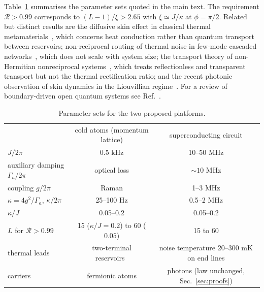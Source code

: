\documentclass[reprint,aps,prl,superscriptaddress,nofootinbib,floatfix]{revtex4-2}
\newcommand{\R}{\mathcal{R}}
\begin{document}
Table~\ref{tab:exp} summarises the parameter sets quoted in the main text. The requirement $\R>0.99$ corresponds to $(L-1)/\xi>2.65$ with $\xi\simeq J/\kappa$ at $\phi=\pi/2$. Related but distinct results are the diffusive skin effect in classical thermal metamaterials~\cite{Cao2021}, which concerns heat conduction rather than quantum transport between reservoirs; non-reciprocal routing of thermal noise in few-mode cascaded networks~\cite{Xuereb2018}, which does not scale with system size; the transport theory of non-Hermitian nonreciprocal systems~\cite{Ghaemi2021}, which treats reflectionless and transparent transport but not the thermal rectification ratio; and the recent photonic observation of skin dynamics in the Liouvillian regime~\cite{Yang2026}. For a review of boundary-driven open quantum systems see Ref.~\cite{Landi2022}.

\begin{table}[h]
\caption{Parameter sets for the two proposed platforms.}
\label{tab:exp}
\begin{ruledtabular}
\begin{tabular}{lcc}
 & cold atoms (momentum lattice) & superconducting circuit \\
\colrule
$J/2\pi$ & 0.5 kHz & 10--50 MHz \\
auxiliary damping $\Gamma_a/2\pi$ & optical loss & $\sim10$ MHz \\
coupling $g/2\pi$ & Raman & 1--3 MHz \\
$\kappa=4g^2/\Gamma_a$, $\kappa/2\pi$ & 25--100 Hz & 0.5--2 MHz \\
$\kappa/J$ & 0.05--0.2 & 0.05--0.2 \\
$L$ for $\R>0.99$ & 15 ($\kappa/J=0.2$) to 60 ($0.05$) & 15 to 60 \\
thermal leads & two-terminal reservoirs~\cite{Brantut2012,Krinner2017} & noise temperature 20--300 mK on end lines \\
carriers & fermionic atoms & photons (law unchanged, Sec.~\ref{sec:proofs}) \\
\end{tabular}
\end{ruledtabular}
\end{table}




\end{document}
